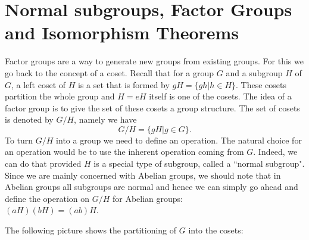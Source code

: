 \documentclass[12pt]{article}
\theoremstyle{plain}
\theoremstyle{definition}
\theoremstyle{remark}
\begin{document}
\section{Normal subgroups, Factor Groups and Isomorphism Theorems}
Factor groups are a way to generate new groups from existing groups. For this we go back to the concept of a coset. Recall that for a group $G$ and a subgroup $H$ of $G$, a left coset of $H$ is a set that is formed by $gH = \{gh|h\in H\}$. These cosets partition the whole group and $H = eH$ itself is one of the cosets. The idea of a factor group is to give the set of these cosets a group structure. The set of cosets is denoted by $G/H$, namely we have
$$G/H = \{gH|g\in G\}.$$
To turn $G/H$ into a group we need to define an operation. The natural choice for an operation would be to use the inherent operation coming from $G$. Indeed, we can do that provided $H$ is a special type of subgroup, called a ``normal subgroup". Since we are mainly concerned with Abelian groups, we should note that in Abelian groups all subgroups are normal and hence we can simply go ahead and define the operation on $G/H$ for Abelian groups:
\\
$(aH)(bH) = (ab)H$. 

The following picture shows the partitioning of $G$ into the cosets:

\bigskip

\end{document}
